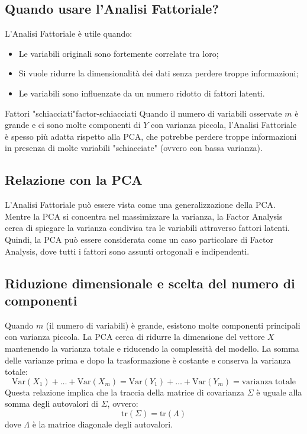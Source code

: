 \subsection{Quando usare l'Analisi Fattoriale?}

L'Analisi Fattoriale è utile quando:
\begin{itemize}
  \item Le variabili originali sono fortemente correlate tra loro;
  \item Si vuole ridurre la dimensionalità dei dati senza perdere troppe
  informazioni;
  \item Le variabili sono influenzate da un numero ridotto di fattori latenti.
\end{itemize}

\begin{nota}{Fattori "schiacciati"}{factor-schiacciati}
Quando il numero di variabili osservate \( m \) è grande e ci sono molte
componenti di \( Y \) con varianza piccola, l'Analisi Fattoriale è spesso più
adatta rispetto alla PCA, che potrebbe perdere troppe informazioni in presenza
di molte variabili "schiacciate" (ovvero con bassa varianza).
\end{nota}

\subsection{Relazione con la PCA}

L'Analisi Fattoriale può essere vista come una generalizzazione della PCA.
Mentre la PCA si concentra nel massimizzare la varianza, la Factor Analysis
cerca di spiegare la varianza condivisa tra le variabili attraverso fattori
latenti. Quindi, la PCA può essere considerata come un caso particolare di
Factor Analysis, dove tutti i fattori sono assunti ortogonali e indipendenti.

\subsection{Riduzione dimensionale e scelta del numero di componenti}

Quando \( m \) (il numero di variabili) è grande, esistono molte componenti
principali con varianza piccola. La PCA cerca di ridurre la dimensione del
vettore \( X \) mantenendo la varianza totale e riducendo la complessità del
modello. La somma delle varianze prima e dopo la trasformazione è costante e
conserva la varianza totale:
\[
\text{Var}(X_1) + \dots + \text{Var}(X_m) = \text{Var}(Y_1) + \dots +
\text{Var}(Y_m) = \text{varianza totale}
\]
Questa relazione implica che la traccia della matrice di covarianza \( \Sigma \)
è uguale alla somma degli autovalori di \( \Sigma \), ovvero:
\[
\text{tr}(\Sigma) = \text{tr}(\Lambda)
\]
dove \( \Lambda \) è la matrice diagonale degli autovalori.

